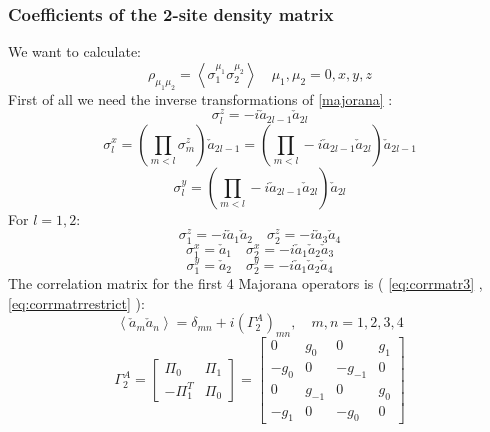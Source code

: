 \documentclass[10pt,a4paper]{article}
\begin{document}
	\subsubsection{Coefficients of the 2-site density matrix}\label{sec:2sitecoff}
	We want to calculate:
	\begin{equation}\label{2sitepauli}\rho_{\mu_{1}  \mu_{2}}=\left\langle\sigma_{1}^{\mu_{1}}  \sigma_{2}^{\mu_{2}}\right\rangle \quad \mu_{1},\mu_{2}=0, x, y, z\end{equation}
	First of all we need the inverse transformations of \ref{majorana} :
	\begin{equation}\label{eq:inversez}
	\sigma_{l}^{z} = -i\check{a}_{2l-1} \check{a}_{2 l} 
	\end{equation}
	\begin{equation}\label{eq:inversex}
	\sigma_{l}^{x}= \left(\prod_{m<l} \sigma_{m}^{z}\right)\check{a}_{2l-1}=
	\left(\prod_{m<l} -i\check{a}_{2l-1} \check{a}_{2 l}\right)\check{a}_{2l-1}
	\end{equation}
	\begin{equation}\label{eq:inversey}
	\sigma_{l}^{y}=
	\left(\prod_{m<l} -i\check{a}_{2l-1} \check{a}_{2 l}\right)\check{a}_{2l}
	\end{equation}
	For $l=1,2:$
	\begin{equation}
	\sigma_1^z=-i\check{a}_1\check{a}_2 \quad
	\sigma_2^z=-i\check{a}_3\check{a}_4
	\end{equation}
	\begin{equation}
	\sigma_1^x=\check{a}_1 \quad \sigma_2^x=-i\check{a}_1\check{a}_2\check{a}_3
	\end{equation}
	\begin{equation}
	\sigma_1^y=\check{a}_2 \quad \sigma_2^y=-i\check{a}_1\check{a}_2\check{a}_4
	\end{equation}
	The correlation matrix for the first 4 Majorana operators is ( \ref{eq:corrmatr3} , \ref{eq:corrmatrrestrict} ):
	\begin{equation}\label{eq:corrmatr2sites1}
	\left\langle\check{a}_{m} \check{a}_{n}\right\rangle=\delta_{m n}+i\left(\Gamma_{2}^{A}\right)_{m n}, \quad m, n=1,2,3,4
	\end{equation}
	\begin{equation}\label{eq:corrmatr2sites2}
	\Gamma_{2}^{A}=\left[\begin{array}{cc}
	\Pi_0 & \Pi_1 \\
	-\Pi_1^T & \Pi_0
	\end{array}\right]
	=\left[\begin{array}{cccc}
	0 & g_0 & 0& g_1\\
	-g_0 & 0 &-g_{-1} & 0\\
	0&g_{-1}&0&g_0\\
	-g_1&0&-g_0& 0
	\end{array}\right]
	\end{equation}
\end{document}
